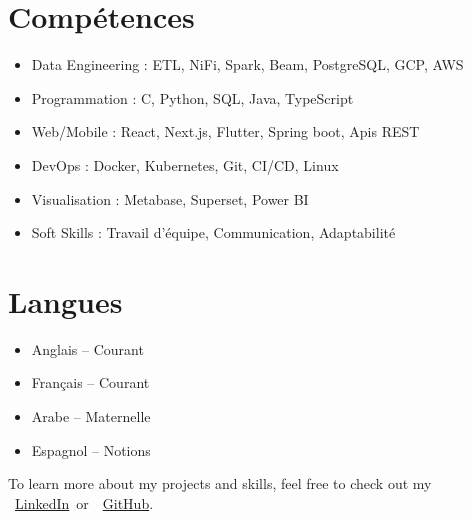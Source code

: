 \documentclass[10pt,a4paper,sans]{moderncv}
\begin{document}
\section{\fontsize{11}{12.1}\selectfont Compétences}
\vspace{-6pt}
\begin{itemize}[leftmargin=0.3cm, itemsep=-2pt, topsep=0pt, partopsep=0pt, parsep=0pt]
    \item Data Engineering : ETL, NiFi, Spark, Beam, PostgreSQL, GCP, AWS
    \item Programmation : C, Python, SQL, Java, TypeScript
    \item Web/Mobile : React, Next.js, Flutter, Spring boot, Apis REST
    \item DevOps : Docker, Kubernetes, Git, CI/CD, Linux
    \item Visualisation : Metabase, Superset, Power BI
    \item Soft Skills : Travail d'équipe, Communication, Adaptabilité
\end{itemize}

\vspace{-15pt}
\section{\fontsize{11}{12.1}\selectfont Langues}
\vspace{-18pt}
\begin{multicols}{2}
\begin{itemize}[leftmargin=0.3cm, itemsep=-2pt, topsep=0pt, partopsep=0pt, parsep=0pt]
    \item Anglais – Courant
    \item Français – Courant
    \item Arabe – Maternelle
    \item Espagnol – Notions
\end{itemize}
\end{multicols}
\vspace{-6pt}

\vspace{0.5em}
\begin{center}
    {\footnotesize\color{gray}
    To learn more about my projects and skills, feel free to check out my~
    \faLinkedin~\href{https://www.linkedin.com/in/ahmed-makroum/}{LinkedIn}~or~\faGithub~\href{https://github.com/ahmedmakroum}{GitHub}.}
\end{center}
\end{document}
